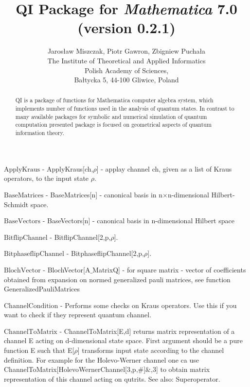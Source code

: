 \documentclass[a4paper,12pt]{article}
\begin{document}
\title{QI Package for \emph{Mathematica} 7.0 (version 0.2.1)}\author{Jaros{\l}aw Miszczak, Piotr Gawron, Zbigniew Pucha{\l}a\\ \small{The Institute of Theoretical and Applied Informatics}\\
\small{Polish Academy of Sciences},\\ \small{Ba{\l}tycka 5, 44-100 Gliwice, Poland}}
\maketitle
\begin{abstract}QI is a package of functions for Mathematica computer algebra system, which implements 
number of functions used in the analysis of quantum states. In contrast to many available 
packages for symbolic and numerical simulation of quantum computation presented package is focused 
on geometrical aspects of quantum information theory.\end{abstract}
\textbf{$ \text{ApplyKraus} $ } - ApplyKraus[ch,$\rho $] - applay channel ch, given as a list of Kraus operators, to the input state $\rho $.$  $

\textbf{$ \text{BaseMatrices} $ } - BaseMatrices[n] - canonical basis in n$\times $n-dimensional Hilbert-Schmidt space.$  $

\textbf{$ \text{BaseVectors} $ } - BaseVectors[n] - canonical basis in n-dimensional Hilbert space$  $

\textbf{$ \text{BitflipChannel} $ } - BitflipChannel[2,p,$\rho $].$  $

\textbf{$ \text{BitphaseflipChannel} $ } - BitphaseflipChannel[2,p,$\rho $].$  $

\textbf{$ \text{BlochVector} $ } - BlochVector[A$\_$MatrixQ] - for square matrix - vector of coefficients obtained from expansion on normed generalized pauli matrices, see function GeneralizedPauliMatrices$  $

\textbf{$ \text{ChannelCondition} $ } - Performs some checks on Kraus operators. Use this if you want to check if they represent quantum channel.$  $

\textbf{$ \text{ChannelToMatrix} $ } - ChannelToMatrix[E,d] returns matrix representation of a channel E acting on d-dimensional state space. First argument should be a pure function E such that E[$\rho $] transforms input state according to the channel definition. For example for the Holevo-Werner channel one ca use ChannelToMatrix[HolevoWernerChannel[3,p,$\#$]$\&$,3] to obtain matrix representation of this channel acting on qutrits. See also: Superoperator.$  $
\end{document}
